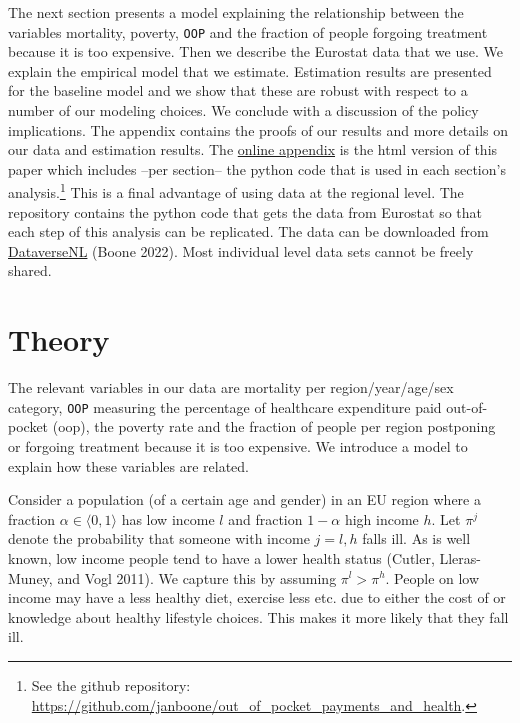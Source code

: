 \documentclass[a4paper,12pt]{article}
\makeatletter
\newcommand{\citeprocitem}[2]{\hyper@linkstart{cite}{citeproc_bib_item_#1}#2\hyper@linkend}
\makeatother
\begin{document}
The next section presents a model explaining the relationship between the variables mortality, poverty, \texttt{OOP} and the fraction of people forgoing treatment because it is too expensive. Then we describe the Eurostat data that we use. We explain the empirical model that we estimate. Estimation results are presented for the baseline model and we show that these are robust with respect to a number of our modeling choices. We conclude with a discussion of the policy implications. The appendix contains the proofs of our results and more details on our data and estimation results. The \href{https://janboone.github.io/out\_of\_pocket\_payments\_and\_health/index.html}{online appendix} is the html version of this paper which includes --per section-- the python code that is used in each section's analysis.\footnote{See the github repository: \url{https://github.com/janboone/out\_of\_pocket\_payments\_and\_health}.} This is a final advantage of using data at the regional level. The repository contains the python code that gets the data from Eurostat so that each step of this analysis can be replicated. The data can be downloaded from \href{https://dataverse.nl/dataset.xhtml?persistentId=doi:10.34894/AABEBD}{DataverseNL} (\citeprocitem{4}{Boone 2022}). Most individual level data sets cannot be freely shared.


\section{Theory}
\label{sec:org7709c16}

The relevant variables in our data are mortality per region/year/age/sex category, \texttt{OOP} measuring the percentage of healthcare expenditure paid out-of-pocket (oop), the poverty rate and the fraction of people per region postponing or forgoing treatment because it is too expensive. We introduce a model to explain how these variables are related.

Consider a population (of a certain age and gender) in an EU region where a fraction \(\alpha \in \langle 0,1 \rangle\) has low income \(l\) and fraction \(1-\alpha\) high income \(h\). Let \(\pi^j\) denote the probability that someone with income \(j=l,h\) falls ill. As is well known, low income people tend to have a lower health status (\citeprocitem{10}{Cutler, Lleras-Muney, and Vogl 2011}). We capture this by assuming \(\pi^l > \pi^h\). People on low income may have a less healthy diet, exercise less etc. due to either the cost of or knowledge about healthy lifestyle choices. This makes it more likely that they fall ill.
\end{document}
